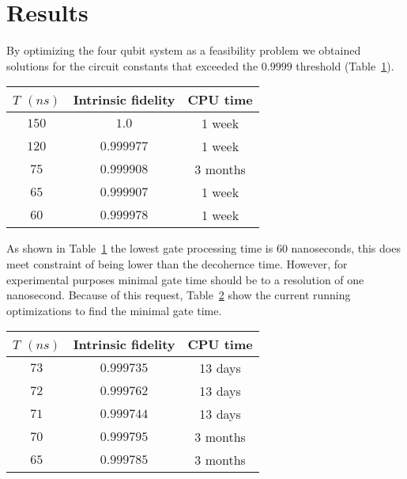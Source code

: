 \section{Results}

By optimizing the four qubit system as a feasibility problem we obtained solutions for the circuit constants that exceeded the $0.9999$ threshold (Table~\ref{results1}).

\begin{table}
  \begin{tabular}{c|c|c}
    \hline   $T$ $(ns)$  & Intrinsic fidelity & CPU time \\
    \hline
    $150$ & $1.0$ & 1 week \\
    $120$ & $0.999977$ & 1 week \\  
    $75$  & $0.999908$ & 3 months\\
    $65$  & $0.999907$ &1 week \\  
    $60$  & $0.999978$ &1 week\\\hline
  \end{tabular}
  \label{results1}
\end{table}

As shown in Table~\ref{results1} the lowest gate processing time is $60$ nanoseconds, this does meet constraint of being lower than the decohernce time. However, for experimental purposes minimal gate time should be to a resolution of one nanosecond. 
Because of this request, Table~\ref{results2} show the current running optimizations to find the minimal gate time. 

\begin{table}
  \begin{tabular}{c | c | c } 
    \hline  $T$ $(ns)$  & Intrinsic fidelity & CPU time \\
    \hline
    $73$  & $0.999735$ & 13 days \\
    $72$  & $0.999762$ & 13 days\\
    $71$  & $0.999744$ & 13 days\\
    $70$  & $0.999795$ & 3 months \\
    $65$  & $0.999785$ & 3 months \\ \hline
  \end{tabular}
  \label{results2}
\end{table}

